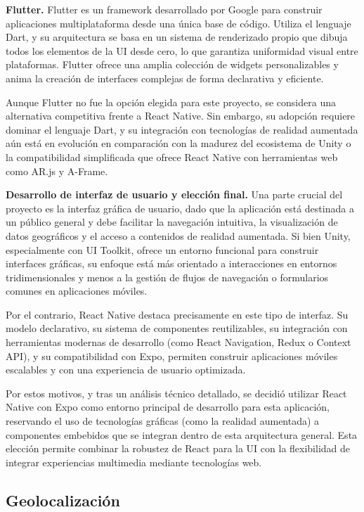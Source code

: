 \textbf{Flutter.} Flutter es un framework desarrollado por Google para construir aplicaciones multiplataforma desde una única base de código. Utiliza el lenguaje Dart, y su arquitectura se basa en un sistema de renderizado propio que dibuja todos los elementos de la UI desde cero, lo que garantiza uniformidad visual entre plataformas. Flutter ofrece una amplia colección de widgets personalizables y anima la creación de interfaces complejas de forma declarativa y eficiente.

Aunque Flutter no fue la opción elegida para este proyecto, se considera una alternativa competitiva frente a React Native. Sin embargo, su adopción requiere dominar el lenguaje Dart, y su integración con tecnologías de realidad aumentada aún está en evolución en comparación con la madurez del ecosistema de Unity o la compatibilidad simplificada que ofrece React Native con herramientas web como AR.js y A-Frame.

\textbf{Desarrollo de interfaz de usuario y elección final.} Una parte crucial del proyecto es la interfaz gráfica de usuario, dado que la aplicación está destinada a un público general y debe facilitar la navegación intuitiva, la visualización de datos geográficos y el acceso a contenidos de realidad aumentada. Si bien Unity, especialmente con UI Toolkit, ofrece un entorno funcional para construir interfaces gráficas, su enfoque está más orientado a interacciones en entornos tridimensionales y menos a la gestión de flujos de navegación o formularios comunes en aplicaciones móviles.

Por el contrario, React Native destaca precisamente en este tipo de interfaz. Su modelo declarativo, su sistema de componentes reutilizables, su integración con herramientas modernas de desarrollo (como React Navigation, Redux o Context API), y su compatibilidad con Expo, permiten construir aplicaciones móviles escalables y con una experiencia de usuario optimizada.

Por estos motivos, y tras un análisis técnico detallado, se decidió utilizar React Native con Expo como entorno principal de desarrollo para esta aplicación, reservando el uso de tecnologías gráficas (como la realidad aumentada) a componentes embebidos que se integran dentro de esta arquitectura general. Esta elección permite combinar la robustez de React para la UI con la flexibilidad de integrar experiencias multimedia mediante tecnologías web.

\subsection{Geolocalización}


